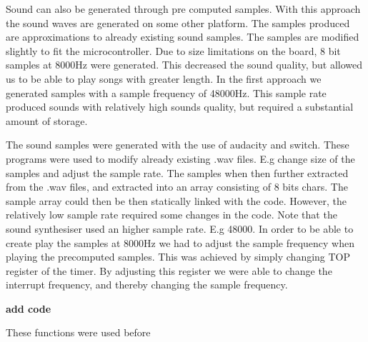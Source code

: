 
Sound can also be generated through pre computed samples. With this approach the sound waves are generated on some other platform. The samples produced are approximations to already existing sound samples. The samples are modified slightly to fit the microcontroller. Due to size limitations on the board, 8 bit samples at 8000Hz were generated. This decreased the sound quality, but allowed us to be able to play songs with greater length. In the first approach we generated samples with a sample frequency of 48000Hz. This sample rate produced sounds with relatively high sounds quality, but required a substantial amount of storage.

The sound samples were generated with the use of audacity and switch. These programs were used to modify already existing .wav files. E.g change size of the samples and adjust the sample rate. The samples when then further extracted from the .wav files, and extracted into an array consisting of 8 bits chars. The sample array could then be then statically linked with the code. However, the relatively low sample rate required some changes in the code. Note that the sound synthesiser used an higher sample rate. E.g 48000. In order to be able to create play the samples at 8000Hz we had to adjust the sample frequency when playing the precomputed samples. This was achieved by simply changing TOP register of the timer. By adjusting this register we were able to change the interrupt frequency, and thereby changing the sample frequency. 

{\bf add code}


These functions were used before 

  











